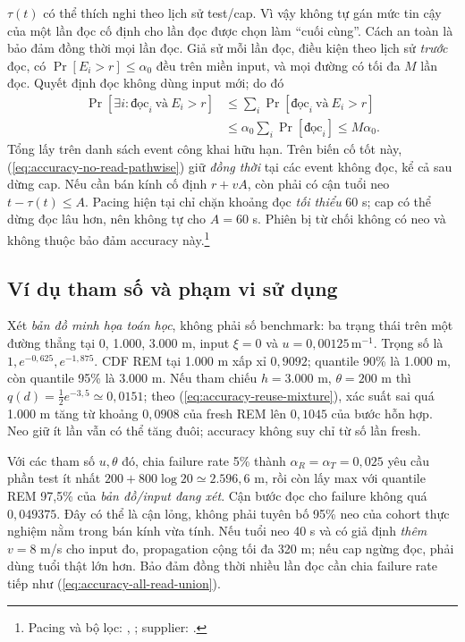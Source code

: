 $\tau(t)$ có thể thích nghi theo lịch sử test/cap. Vì vậy không tự gán
mức tin cậy của một lần đọc cố định cho lần đọc được chọn làm ``cuối cùng''.
Cách an toàn là bảo đảm đồng thời mọi lần đọc. Giả sử mỗi lần đọc, điều
kiện theo lịch sử \emph{trước} đọc, có $\Pr[E_i>r]\leq\alpha_0$ đều trên
miền input, và mọi đường có tối đa $M$ lần đọc. Quyết định đọc không dùng
input mới; do đó
\begin{equation}
 \begin{split}
 \Pr[\exists i:\text{đọc}_i\ \text{và}\ E_i>r]
 &\leq\sum_i\Pr[\text{đọc}_i\ \text{và}\ E_i>r]\\
 &\leq\alpha_0\sum_i\Pr[\text{đọc}_i]
 \leq M\alpha_0.
 \end{split}
 \label{eq:accuracy-all-read-union}
\end{equation}
Tổng lấy trên danh sách event công khai hữu hạn. Trên biến cố tốt này,
(\ref{eq:accuracy-no-read-pathwise}) giữ \emph{đồng thời} tại các event
không đọc, kể cả sau dừng cap. Nếu cần bán kính cố định $r+vA$, còn phải
có cận tuổi neo $t-\tau(t)\leq A$. Pacing hiện tại chỉ chặn khoảng đọc
\emph{tối thiểu} 60 s; cap có thể dừng đọc lâu hơn, nên không tự cho
$A=60$ s. Phiên bị từ chối không có neo và không thuộc bảo đảm accuracy
này.\footnote{Pacing và bộ lọc: ,
; supplier:
.}

\subsection{Ví dụ tham số và phạm vi sử dụng}
\label{sec:formal-accuracy-example}

Xét \emph{bản đồ minh họa toán học}, không phải số benchmark: ba trạng thái
trên một đường thẳng tại 0, 1.000, 3.000 m, input $\xi=0$ và
$u=0{,}00125\,\mathrm m^{-1}$. Trọng số là
$1,e^{-0{,}625},e^{-1{,}875}$. CDF REM tại 1.000 m xấp xỉ $0{,}9092$;
quantile 90\% là 1.000 m, còn quantile 95\% là 3.000 m. Nếu tham chiếu
$h=3.000$ m, $\theta=200$ m thì $q(d)=\tfrac12e^{-3{,}5}\simeq0{,}0151$;
theo (\ref{eq:accuracy-reuse-mixture}), xác suất sai quá 1.000 m tăng từ
khoảng $0{,}0908$ của fresh REM lên $0{,}1045$ của bước hỗn hợp. Neo giữ
ít lần vẫn có thể tăng đuôi; accuracy không suy chỉ từ số lần fresh.

Với các tham số $u,\theta$ đó, chia failure rate 5\% thành
$\alpha_R=\alpha_T=0{,}025$ yêu cầu phần test ít nhất
$200+800\log20\simeq2.596{,}6$ m, rồi còn lấy max với quantile REM 97,5\%
của \emph{bản đồ/input đang xét}. Cận bước đọc cho failure không quá
$0{,}049375$. Đây có thể là cận lỏng, không phải tuyên bố 95\% neo của
cohort thực nghiệm nằm trong bán kính vừa tính. Nếu tuổi neo 40 s và có
giả định \emph{thêm} $v=8$ m/s cho input đo, propagation cộng tối đa
320 m; nếu cap ngừng đọc, phải dùng tuổi thật lớn hơn. Bảo đảm đồng thời
nhiều lần đọc cần chia failure rate tiếp như
(\ref{eq:accuracy-all-read-union}).

